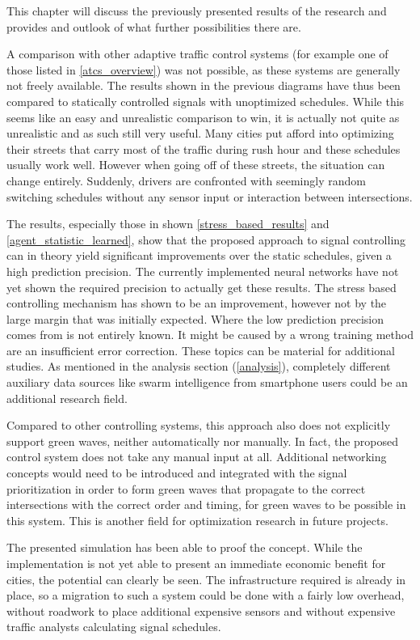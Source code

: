This chapter will discuss the previously presented results of the research and provides and outlook of what further possibilities there are.

A comparison with other adaptive traffic control systems (for example one of those listed in \autoref{atcs_overview}) was not possible, as these systems are generally not freely available. The results shown in the previous diagrams have thus been compared to statically controlled signals with unoptimized schedules. While this seems like an easy and unrealistic comparison to win, it is actually not quite as unrealistic and as such still very useful. Many cities put afford into optimizing their streets  that carry most of the traffic during rush hour and these schedules usually work well. However when going off of these streets, the situation can change entirely. Suddenly, drivers are confronted with seemingly random switching schedules without any sensor input or interaction between intersections.

The results, especially those in shown \autoref{stress_based_results} and \autoref{agent_statistic_learned}, show that the proposed approach to signal controlling can in theory yield significant improvements over the static schedules, given a high prediction precision. The currently implemented neural networks have not yet shown the required precision to actually get these results. The stress based controlling mechanism has shown to be an improvement, however not by the large margin that was initially expected. Where the low prediction precision comes from is not entirely known. It might be caused by a wrong training method are an insufficient error correction. These topics can be material for additional studies. As mentioned in the analysis section (\autoref{analysis}), completely different auxiliary data sources like swarm intelligence from smartphone users could be an additional research field.

Compared to other controlling systems, this approach also does not explicitly support green waves, neither automatically nor manually. In fact, the proposed control system does not take any manual input at all. Additional networking concepts would need to be introduced and integrated with the signal prioritization in order to form green waves that propagate to the correct intersections with the correct order and timing, for green waves to be possible in this system. This is another field for optimization research in future projects.

The presented simulation has been able to proof the concept. While the implementation is not yet able to present an immediate economic benefit for cities, the potential can clearly be seen. The infrastructure required is already in place, so a migration to such a system could be done with a fairly low overhead, without roadwork to place additional expensive sensors and without expensive traffic analysts calculating signal schedules.

